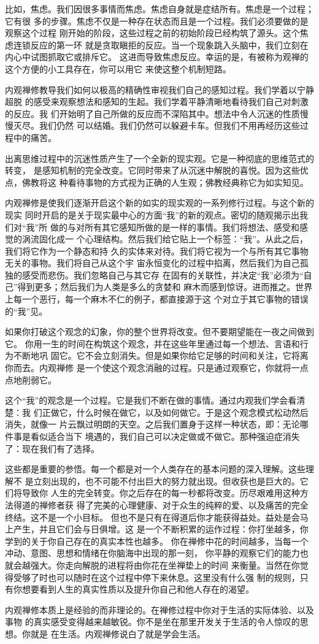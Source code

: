 比如，焦虑。我们因很多事情而焦虑。焦虑自身就是症结所有。焦虑是一个过程；它有很
多的步骤。焦虑不仅是一种存在状态而且是一个过程。我们必须要做的是观察这个过程
刚开始的阶段，这些过程之前的初始阶段已经构筑了源头。这个焦虑连锁反应的第一环
就是贪取瞋拒的反应。当一个现象跳入头脑中，我们立刻在内心中试图抓取它或排斥它。
这进而导致焦虑反应。幸运的是，有被称为观禅的这个方便的小工具存在，你可以用它
来使这整个机制短路。

内观禅修教导我们如何以极高的精确性审视我们自己的感知过程。我们学着以宁静超脱
的感受来观察想法和感知的生起。我们学着平静清晰地看待我们自己对刺激的反应。我
们开始明了自己所做的反应而不深陷其中。想法中令人沉迷的性质慢慢\1灭尽。我们仍然
可以结婚。我们仍然可以躲避卡车。但我们不用再经历这些过程中的痛苦。

出离思维过程中的沉迷性质产生了一个全新的现实观。它是一种彻底的思维范式的转变，
是感知机制的完全改变。它同时带来了从沉迷中解脱的喜悦。因为这些优点，佛教将这
种看待事物的方式视为正确的人生观；佛教经典称它为如实知见。

内观禅修是使我们逐渐开启这个新的如实的现实观的一系列修行过程。与这个新的现实
同时开启的是关于现实最中心的方面“我”的新的观点。密切的随观揭示出我们对“我”所
做的与对所有其它感知所做的是一样的事情。我们将想法、感受和感觉的涡流固化成一
个心理结构。然后我们给它贴上一个标签：“我”。从此之后，我们将它作为一个静态和持
久的实体来对待。我们将它视为一个与所有其它事物无关的事物。我们将自己从这个宇
宙永恒变化的过程中掐离，然后我们为自己孤独的感受而悲伤。我们忽略自己与其它存
在固有的关联性，并决定“我”必须为“自己”得到更多；然后我们为人类是多么的贪婪和
麻木而感到惊讶。进而推之。世界上每一个恶行，每一个麻木不仁的例子，都直接源于这
个对立于其它事物的错误的“我”见。

如果你打破这个观念的幻象，你的整个世界将改变。但不要期望能在一夜之间做到它。
你用一生的时间在构筑这个观念，并在这些年里通过每一个想法、言语和行为不断地巩
固它。它不会立刻消失。但是如果你给它足够的时间和关注，它将离你而去。内观禅修
是一个使这个观念消融的过程。只是通过观察它，你就将一点点地削弱它。\1

这个“我”的观念是一个过程。它是我们不断在做的事情。通过内观我们学会看清楚：我
们正做它，什么时候在做它，以及如何做它。于是这个观念模式松动然后消失，就像一
片云飘过明朗的天空。之后我们置身于这样一种状态，即：无论哪件事是看似适合当下
境遇的，我们自己可以决定做或不做它。那种强迫症消失了：现在我们有了选择。

这些都是重要的参悟。每一个都是对一个人类存在的基本问题的深入理解。这些理解不
是立刻出现的，也不可能不付出巨大的努力就出现。但收获也是巨大的。它们将导致你
人生的完全转变。你之后存在的每一秒都将改变。历尽艰难用这种方法得道的禅修者获
得了完美的心理健康、对于众生的纯粹的爱、以及痛苦的完全终结。这不是一个小目标。
但也不是只有在得道后你才能获得益处。益处是会马上产生，并且它们会与日俱增。这
是一个不断积累的运作过程：你打坐越多，你学到的关于你自己存在的真实本性也越多。
你在禅修中花的时间越多，当每一个冲动、意图、思想和情绪在你脑海中出现的那一刻，
你平静的观察它们的能力也就会越强大。你走向解脱的进程将由你花在坐禅垫上的时间
来衡量。当然在你觉得受够了时也可以随时在这个过程中停下来休息。这里没有什么强
制的规则，只有你想要看到人生的真实性质以及提升你自己和他人存在的渴望。

内观禅修本质上是经验的而非理论的。在禅修过程中你对于生活的实际体验、以及事物
的真实感受变得越来越敏锐。你不是坐在那里开发关于生活的令人惊叹的思想。你就是
在生活。内观禅修说白了就是学会生活。

\endchapter

\byebye
